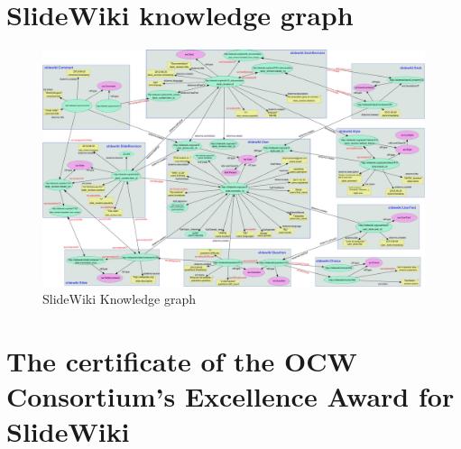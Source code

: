 \chapter{SlideWiki knowledge graph}
\label{app:knowledge_graph}

\begin{figure}
    \centering
    \includegraphics[width=\columnwidth]{images/knowledge_graph.png}
    \caption{SlideWiki Knowledge graph}
	\label{fig:knowledge_graph}
\end{figure}

\chapter{The certificate of the OCW Consortium's Excellence Award for SlideWiki}
\label{fig:ocw_global_award}

